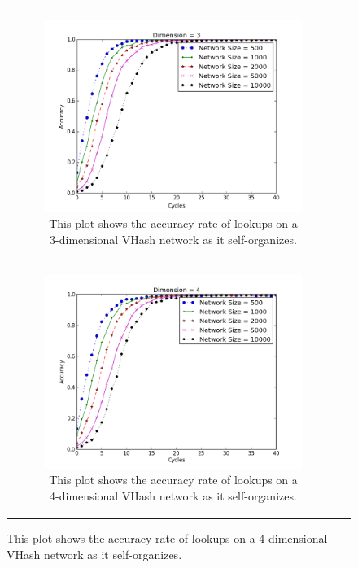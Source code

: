 \documentclass[10pt, conference, letterpaper]{IEEEtran}
\begin{document}
\begin{figure}
\begin{tabular}{cc}
\begin{subfigure}{\columnwidth}
        \includegraphics[width=\columnwidth]{conv_d3}
        \caption{This plot shows the accuracy rate of lookups on a 3-dimensional VHash network as it self-organizes.}
        \label{conv3}
\end{subfigure} \\

\begin{subfigure}{\columnwidth}
        \includegraphics[width=\linewidth]{conv_d4}
         \caption{This plot shows the accuracy rate of lookups on a 4-dimensional VHash network as it self-organizes.}
         \label{conv4}
\end{subfigure} &



\end{tabular}
\end{figure}
\end{document}
